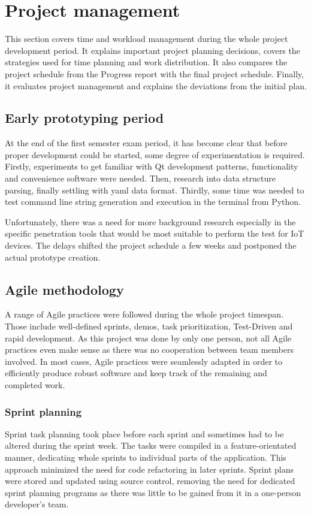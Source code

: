 \section{Project management} \label{project-man}
This section covers time and workload management during the whole project development period. It explains important project planning decisions, covers the strategies used for time planning and work distribution. It also compares the project schedule from the Progress report with the final project schedule. Finally, it evaluates project management and explains the deviations from the initial plan.

\subsection{Early prototyping period}
	At the end of the first semester exam period, it has become clear that before proper development could be started, some degree of experimentation is required. Firstly, experiments to get familiar with Qt development patterns, functionality and convenience software were needed. Then, research into data structure parsing, finally settling with yaml data format. Thirdly, some time was needed to test command line string generation and execution in the terminal from Python.
	
	Unfortunately, there was a need for more background research especially in the specific penetration tools that would be most suitable to perform the test for IoT devices. The delays shifted the project schedule a few weeks and postponed the actual prototype creation. 
	
	\subsection{Agile methodology}
		A range of Agile practices were followed during the whole project timespan. Those include well-defined sprints, demos, task prioritization, Test-Driven and rapid development. As this project was done by only one person, not all Agile practices even make sense as there was no cooperation between team members involved. In most cases, Agile practices were seamlessly adapted in order to efficiently produce robust software and keep track of the remaining and completed work.
	
	
		\subsubsection{Sprint planning}
		Sprint task planning took place before each sprint and sometimes had to be altered during the sprint week. The tasks were compiled in a feature-orientated manner, dedicating whole sprints to individual parts of the application. This approach minimized the need for code refactoring in later sprints. Sprint plans were stored and updated using source control, removing the need for dedicated sprint planning programs as there was little to be gained from it in a one-person developer’s team. 
		
